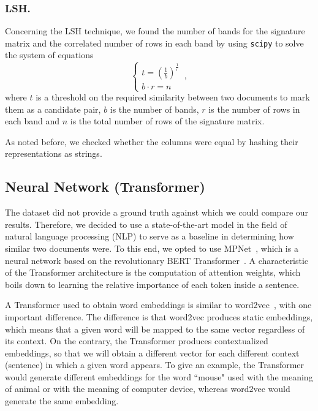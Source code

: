 \documentclass[runningheads]{llncs}
\begin{document}
\subsubsection{LSH.} Concerning the LSH technique, we found the number of bands for the signature matrix and the correlated number of rows in each band by using \texttt{scipy} to solve the system of equations
\begin{equation}
  \begin{cases}
    t = (\frac{1}{b})^\frac{1}{r}\\
    b \cdot r = n
  \end{cases}\,,
\end{equation}
where $t$ is a threshold on the required similarity between two documents to mark them as a candidate pair, $b$ is the number of bands, $r$ is the number of rows in each band and $n$ is the total number of rows of the signature matrix.

As noted before, we checked whether the columns were equal by hashing their representations as strings.

\subsection{Neural Network (Transformer)}
\label{subsec:models:transformer}

The dataset did not provide a ground truth against which we could compare our results. Therefore, we decided to use a state-of-the-art model in the field of natural language processing (NLP) to serve as a baseline in determining how similar two documents were. To this end, we opted to use MPNet~\cite{song_2020}, which is a neural network based on the revolutionary BERT Transformer~\cite{vaswani_2017, devlin-etal-2019-bert}. A characteristic of the Transformer architecture is the computation of attention weights, which boils down to learning the relative importance of each token inside a sentence. 

A Transformer used to obtain word embeddings is similar to word2vec~\cite{mikolov-etal-2013-word2vec}, with one important difference. The difference is that word2vec produces static embeddings, which means that a given word will be mapped to the same vector regardless of its context. On the contrary, the Transformer produces contextualized embeddings, so that we will obtain a different vector for each different context (sentence) in which a given word appears. To give an example, the Transformer would generate different embeddings for the word “mouse" used with the meaning of animal or with the meaning of computer device, whereas word2vec would generate the same embedding.
\end{document}
